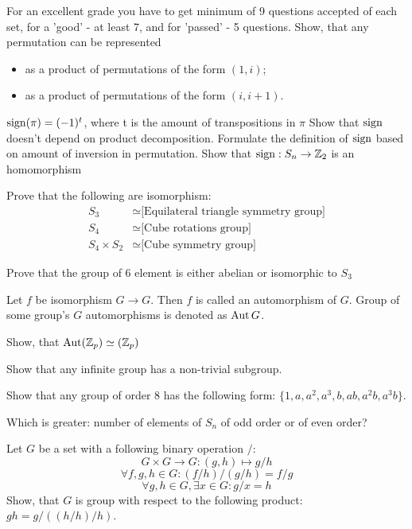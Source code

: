 \documentclass[12pt]{article}
\begin{document}
	
	For an excellent grade you have to get minimum of 9 questions accepted  of each set, for a 'good' - at least 7, and for 'passed' - 5 questions.	
	\p
	Show, that any permutation can be represented
	\begin{itemize}
	\item as a product of permutations of the form $(1,i)$;
	\item as a product of permutations of the form $(i, i+1)$.
\end{itemize}
	\ep
	\df
	$\operatorname{sign}(\pi)=(-1)^t$, where t is the amount of transpositions in $\pi$ 
	\edf
	\p
	Show that  $\operatorname{sign}$ doesn't depend on product decomposition. Formulate the definition of $\operatorname{sign}$ based on amount of inversion in permutation. 
	\ep
	\p
   	Show that $\operatorname{sign}: S_n \to {\mathbb Z}_2$ is an homomorphism
	\ep


	\p 
	Prove that the following are isomorphism:
	\begin{align*}
	S_3 &\simeq \text{[Equilateral triangle symmetry group]} \\
	S_4 &\simeq \text{[Cube rotations group]}\\
	S_4 \times S_2 &\simeq{\text{[Cube symmetry group]}}
	\end{align*}
	\ep
	
	\p Prove that the group of 6 element is either abelian or isomorphic to $S_3$
	\ep
	
	\df Let $f$ be isomorphism $G \to G$. Then $f$ is called an automorphism of $G$. Group of some group's $G$ automorphisms is denoted as $\operatorname{Aut} G$.
	\edf

	\p Show, that
	$\operatorname{Aut}({\mathbb Z}_p) \simeq ({\mathbb Z}_p)$
	\ep
	
	\p Show that any infinite group has a non-trivial subgroup.
	\ep
	
	\p Show that any group of order 8 has the following form: $\{1,a, a^2, a^3, b, ab, a^2 b, a^3 b\}$. 
	\ep
	
	\p 
	Which is greater: number of elements of $S_n$ of odd order or of even order?
	\ep

	\p
	Let  $G$ be a set with a following binary operation  $/$:
	$$
		G \times G \to G: (g,h) \mapsto g/h
	$$
	$$
	\forall f,g,h \in G: (f/h)/(g/h) = f/g
	$$
	$$
	\forall g,h \in G, \exists x \in G: g/x=h
	$$
   Show, that $G$ is group with respect to the following product: $gh = g/ ((h/h)/h)$.
	\ep
	
\end{document}
